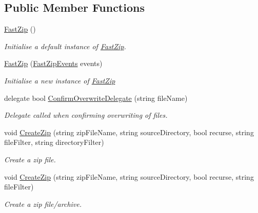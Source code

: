 \subsection*{Public Member Functions}
\begin{DoxyCompactItemize}
\item 
\hyperlink{class_i_c_sharp_code_1_1_sharp_zip_lib_1_1_zip_1_1_fast_zip_a588d2d45761663c3cc239d307539be58}{Fast\+Zip} ()
\begin{DoxyCompactList}\small\item\em Initialise a default instance of \hyperlink{class_i_c_sharp_code_1_1_sharp_zip_lib_1_1_zip_1_1_fast_zip}{Fast\+Zip}. \end{DoxyCompactList}\item 
\hyperlink{class_i_c_sharp_code_1_1_sharp_zip_lib_1_1_zip_1_1_fast_zip_aed00fd01b88152f43be78fbe78f89cd3}{Fast\+Zip} (\hyperlink{class_i_c_sharp_code_1_1_sharp_zip_lib_1_1_zip_1_1_fast_zip_events}{Fast\+Zip\+Events} events)
\begin{DoxyCompactList}\small\item\em Initialise a new instance of \hyperlink{class_i_c_sharp_code_1_1_sharp_zip_lib_1_1_zip_1_1_fast_zip}{Fast\+Zip} \end{DoxyCompactList}\item 
delegate bool \hyperlink{class_i_c_sharp_code_1_1_sharp_zip_lib_1_1_zip_1_1_fast_zip_ac6c1d642626ec6123c60822e3e731b24}{Confirm\+Overwrite\+Delegate} (string file\+Name)
\begin{DoxyCompactList}\small\item\em Delegate called when confirming overwriting of files. \end{DoxyCompactList}\item 
void \hyperlink{class_i_c_sharp_code_1_1_sharp_zip_lib_1_1_zip_1_1_fast_zip_a76b5a47f4280c890076ecbb575107023}{Create\+Zip} (string zip\+File\+Name, string source\+Directory, bool recurse, string file\+Filter, string directory\+Filter)
\begin{DoxyCompactList}\small\item\em Create a zip file. \end{DoxyCompactList}\item 
void \hyperlink{class_i_c_sharp_code_1_1_sharp_zip_lib_1_1_zip_1_1_fast_zip_a5fc62b20ea1aa111f1ccb80d5d4f8182}{Create\+Zip} (string zip\+File\+Name, string source\+Directory, bool recurse, string file\+Filter)
\begin{DoxyCompactList}\small\item\em Create a zip file/archive. \end{DoxyCompactList}\item 

\end{DoxyCompactItemize}
